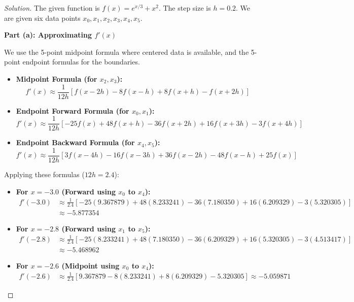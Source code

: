 \documentclass[11pt, a4paper]{article}
\newif\ifsolutionnewpage
\newenvironment{solution}
  {\begin{proof}[Solution]}
  {\end{proof}\ifsolutionnewpage\newpage\fi}
\begin{document}
    \begin{solution}
    The given function is $f(x) = e^{x/3} + x^2$. The step size is $h = 0.2$. We are given six data points $x_0, x_1, x_2, x_3, x_4, x_5$.
    
    \vspace{0.3cm}
    \textbf{Part (a): Approximating $f'(x)$}
    
    We use the 5-point midpoint formula where centered data is available, and the 5-point endpoint formulas for the boundaries.
    \begin{itemize}
        \item \textbf{Midpoint Formula (for $x_2, x_3$):}
        $$ f'(x) \approx \frac{1}{12h} \left[ f(x-2h) - 8f(x-h) + 8f(x+h) - f(x+2h) \right] $$
        \item \textbf{Endpoint Forward Formula (for $x_0, x_1$):}
        $$ f'(x) \approx \frac{1}{12h} \left[ -25f(x) + 48f(x+h) - 36f(x+2h) + 16f(x+3h) - 3f(x+4h) \right] $$
        \item \textbf{Endpoint Backward Formula (for $x_4, x_5$):}
        $$ f'(x) \approx \frac{1}{12h} \left[ 3f(x-4h) - 16f(x-3h) + 36f(x-2h) - 48f(x-h) + 25f(x) \right] $$
    \end{itemize}
    
    Applying these formulas ($12h = 2.4$):
    \begin{itemize}
        \item \textbf{For $x = -3.0$ (Forward using $x_0$ to $x_4$):}
        \begin{align*}
        f'(-3.0) &\approx \frac{1}{2.4} \left[ -25(9.367879) + 48(8.233241) - 36(7.180350) + 16(6.209329) - 3(5.320305) \right] \\
        &\approx \mathbf{-5.877354}
        \end{align*}
    
        \item \textbf{For $x = -2.8$ (Forward using $x_1$ to $x_5$):}
        \begin{align*}
        f'(-2.8) &\approx \frac{1}{2.4} \left[ -25(8.233241) + 48(7.180350) - 36(6.209329) + 16(5.320305) - 3(4.513417) \right] \\
        &\approx \mathbf{-5.468962}
        \end{align*}
    
        \item \textbf{For $x = -2.6$ (Midpoint using $x_0$ to $x_4$):}
        \begin{align*}
        f'(-2.6) &\approx \frac{1}{2.4} \left[ 9.367879 - 8(8.233241) + 8(6.209329) - 5.320305 \right] \approx \mathbf{-5.059871}
        \end{align*}
    

\end{itemize}
\end{solution}
\end{document}
